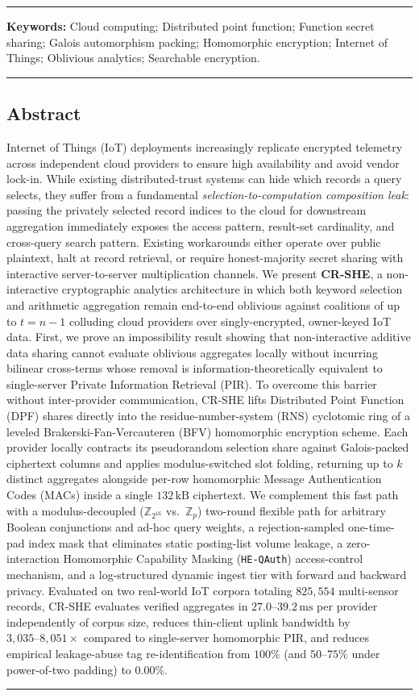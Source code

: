 \documentclass[11pt,a4paper]{article}
\begin{document}
\vspace{6pt}
\noindent\rule{\textwidth}{0.6pt}
\textbf{Keywords:} Cloud computing; Distributed point function; Function secret sharing; Galois automorphism packing; Homomorphic encryption; Internet of Things; Oblivious analytics; Searchable encryption.
\vspace{2pt}
\noindent\rule{\textwidth}{0.4pt}

\subsection*{Abstract}
Internet of Things (IoT) deployments increasingly replicate encrypted telemetry across independent cloud providers to ensure high availability and avoid vendor lock-in. While existing distributed-trust systems can hide which records a query selects, they suffer from a fundamental \textit{selection-to-computation composition leak}: passing the privately selected record indices to the cloud for downstream aggregation immediately exposes the access pattern, result-set cardinality, and cross-query search pattern. Existing workarounds either operate over public plaintext, halt at record retrieval, or require honest-majority secret sharing with interactive server-to-server multiplication channels. We present \textbf{CR-SHE}, a non-interactive cryptographic analytics architecture in which both keyword selection and arithmetic aggregation remain end-to-end oblivious against coalitions of up to $t = n - 1$ colluding cloud providers over singly-encrypted, owner-keyed IoT data. First, we prove an impossibility result showing that non-interactive additive data sharing cannot evaluate oblivious aggregates locally without incurring bilinear cross-terms whose removal is information-theoretically equivalent to single-server Private Information Retrieval (PIR). To overcome this barrier without inter-provider communication, CR-SHE lifts Distributed Point Function (DPF) shares directly into the residue-number-system (RNS) cyclotomic ring of a leveled Brakerski-Fan-Vercauteren (BFV) homomorphic encryption scheme. Each provider locally contracts its pseudorandom selection share against Galois-packed ciphertext columns and applies modulus-switched slot folding, returning up to $k$ distinct aggregates alongside per-row homomorphic Message Authentication Codes (MACs) inside a single $132\,\text{kB}$ ciphertext. We complement this fast path with a modulus-decoupled ($\mathbb{Z}_{2^{16}}$ vs.\ $\mathbb{Z}_p$) two-round flexible path for arbitrary Boolean conjunctions and ad-hoc query weights, a rejection-sampled one-time-pad index mask that eliminates static posting-list volume leakage, a zero-interaction Homomorphic Capability Masking (\texttt{HE-QAuth}) access-control mechanism, and a log-structured dynamic ingest tier with forward and backward privacy. Evaluated on two real-world IoT corpora totaling $825{,}554$ multi-sensor records, CR-SHE evaluates verified aggregates in $27.0\text{--}39.2\,\text{ms}$ per provider independently of corpus size, reduces thin-client uplink bandwidth by $3{,}035\text{--}8{,}051\times$ compared to single-server homomorphic PIR, and reduces empirical leakage-abuse tag re-identification from $100\%$ (and $50\text{--}75\%$ under power-of-two padding) to $0.00\%$.
\noindent\rule{\textwidth}{0.6pt}
\end{document}
